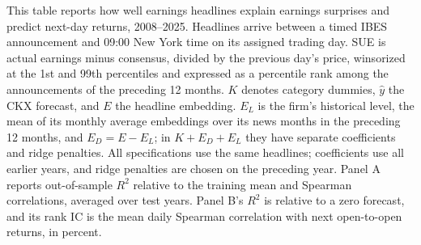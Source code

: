 \begin{table}[htbp]
\centering
\caption{Explaining Earnings Surprises and Predicting Next-Day Returns}
\label{tab:tab3}
\begin{minipage}{\linewidth}\footnotesize
This table reports how well earnings headlines explain earnings surprises and predict next-day returns, 2008--2025. Headlines arrive between a timed IBES announcement and 09:00 New York time on its assigned trading day. SUE is actual earnings minus consensus, divided by the previous day's price, winsorized at the 1st and 99th percentiles and expressed as a percentile rank among the announcements of the preceding 12 months. $K$ denotes category dummies, $\hat y$ the CKX forecast, and $E$ the headline embedding. $E_L$ is the firm's historical level, the mean of its monthly average embeddings over its news months in the preceding 12 months, and $E_D=E-E_L$; in $K+E_D+E_L$ they have separate coefficients and ridge penalties. All specifications use the same headlines; coefficients use all earlier years, and ridge penalties are chosen on the preceding year. Panel A reports out-of-sample $R^2$ relative to the training mean and Spearman correlations, averaged over test years. Panel B's $R^2$ is relative to a zero forecast, and its rank IC is the mean daily Spearman correlation with next open-to-open returns, in percent.
\end{minipage}
\medskip


\end{table}
